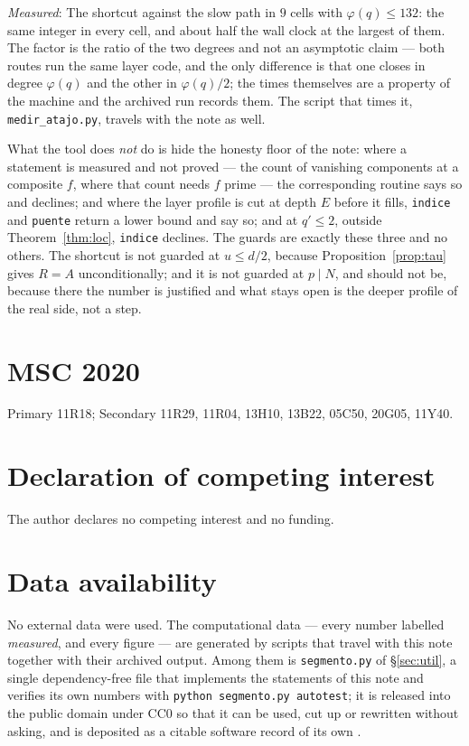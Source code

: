 \documentclass[11pt,a4paper]{article}
\theoremstyle{definition}
\newcommand{\medido}[1]{\emph{Measured}: #1}
\begin{document}
\medido{The shortcut against the slow path in $9$ cells with $\varphi(q)\le132$: the same integer
in every cell, and about half the wall clock at the largest of them. The factor is the ratio of the
two degrees and not an asymptotic claim --- both routes run the same layer code, and the only
difference is that one closes in degree $\varphi(q)$ and the other in $\varphi(q)/2$; the times
themselves are a property of the machine and the archived run records them. The script that times
it, \texttt{medir\_atajo.py}, travels with the note as well.}

\noindent What the tool does \emph{not} do is hide the honesty floor of the note: where a
statement is measured and not proved --- the count of vanishing components at a composite $f$,
where that count needs $f$ prime --- the corresponding routine says so and declines; and where the layer profile is cut at depth $E$
before it fills, \texttt{indice} and \texttt{puente} return a lower bound and say so; and at
$q'\le2$, outside Theorem~\ref{thm:loc}, \texttt{indice} declines. The guards are exactly these
three and no others. The shortcut is not guarded at $u\le d/2$, because
Proposition~\ref{prop:tau} gives $R=A$ unconditionally; and it is not guarded at $p\mid N$,
and should not be, because there the number is justified and what stays open is the deeper
profile of the real side, not a step.

\section*{MSC 2020}
Primary 11R18; Secondary 11R29, 11R04, 13H10, 13B22, 05C50, 20G05, 11Y40.

\section*{Declaration of competing interest}
The author declares no competing interest and no funding.

\section*{Data availability}
No external data were used. The computational data --- every number labelled \emph{measured}, and
every figure --- are generated by scripts that travel with this note together with their archived
output. Among them is \texttt{segmento.py} of \S\ref{sec:util}, a single dependency-free file that
implements the statements of this note and verifies its own numbers with
\texttt{python segmento.py autotest}; it is released into the public domain under CC0 so that it
can be used, cut up or rewritten without asking, and is deposited as a citable software record of
its own \cite{Tool}.
\end{document}

